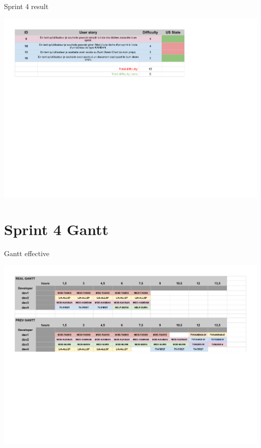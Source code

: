 \documentclass{beamer}
\begin{document}
\begin{frame}{Sprint 4 result}
	\begin{center}
        \includegraphics[scale=0.55]{Sprint4.pdf}
        \end{center}
\end{frame}


\section{Sprint 4 Gantt }

\begin{frame}{Gantt effective}
	\begin{center}
        \includegraphics[scale=0.41]{Gantt4real.pdf}
        \end{center}
\end{frame}
\end{document}
